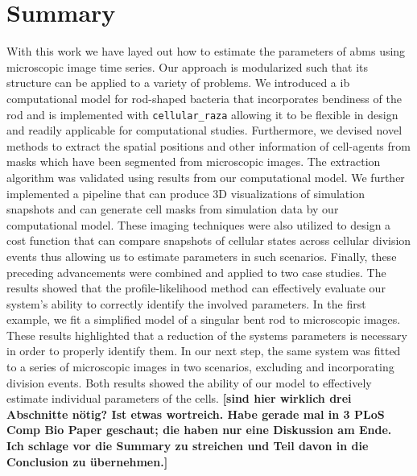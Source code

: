 \documentclass[10pt,letterpaper]{article}
\begin{document}

\section{Summary}
With this work we have layed out how to estimate the parameters of \acp{abm} using
microscopic image time series.
Our approach is modularized such that its structure can be applied to a variety of problems.
We introduced a \ac{ib} computational model for rod-shaped bacteria that incorporates bendiness of
the rod and is implemented with \texttt{cellular\_raza} allowing it to be flexible in design and
readily applicable for computational studies.
Furthermore, we devised novel methods to extract the spatial positions and other information of
cell-agents from masks which have been segmented from microscopic images.
The extraction algorithm was validated using results from our computational model.
We further implemented a pipeline that can produce 3D visualizations of simulation snapshots and can
generate cell masks from simulation data by our computational model.
These imaging techniques were also utilized to design a cost function that can compare snapshots
of cellular states across cellular division events thus allowing us to estimate parameters in such
scenarios.  Finally, these preceding advancements were combined and applied to two case studies.
The results showed that the profile-likelihood method can effectively evaluate our system's ability
to correctly identify the involved parameters.
In the first example, we fit a simplified model of a singular bent rod to microscopic images.
These results highlighted that a reduction of the systems parameters is necessary in order to
properly identify them.
In our next step, the same system was fitted to a series of microscopic images in two scenarios,
excluding and incorporating division events.
Both results showed the ability of our model to effectively estimate individual parameters of the
cells.
{\bf [sind hier wirklich drei Abschnitte nötig? Ist etwas wortreich. Habe gerade mal in 3 PLoS Comp Bio Paper geschaut; die haben nur eine Diskussion am Ende. Ich schlage vor die Summary zu streichen und Teil davon in die Conclusion zu übernehmen.]}
\end{document}
